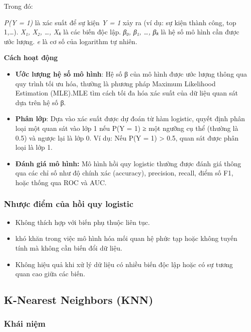 \documentclass[
]{article}
\providecommand{\tightlist}{%
  \setlength{\itemsep}{0pt}\setlength{\parskip}{0pt}}
\begin{document}
Trong đó:

\emph{P(Y = 1)} là xác suất để sự kiện \emph{Y = 1} xảy ra (ví dụ: sự
kiện thành công, top 1,\ldots). \emph{X₁, X₂, \ldots, Xₖ} là các biến
độc lập. \emph{β₀, β₁, \ldots, βₖ} là hệ số mô hình cần được ước lượng.
\emph{e} là cơ số của logarithm tự nhiên.

\textbf{Cách hoạt động}

\begin{itemize}
\item
  \textbf{Ước lượng hệ số mô hình}: Hệ số β của mô hình được ước lượng
  thông qua quy trình tối ưu hóa, thường là phương pháp Maximum
  Likelihood Estimation (MLE).MLE tìm cách tối đa hóa xác suất của dữ
  liệu quan sát dựa trên hệ số β.
\item
  \textbf{Phân lớp}: Dựa vào xác suất được dự đoán từ hàm logistic,
  quyết định phân loại một quan sát vào lớp 1 nếu P(Y = 1) ≥ một ngưỡng
  cụ thể (thường là 0.5) và ngược lại là lớp 0. Ví dụ: Nếu P(Y = 1)
  \textgreater{} 0.5, quan sát được phân loại là lớp 1.
\item
  \textbf{Đánh giá mô hình:} Mô hình hồi quy logistic thường được đánh
  giá thông qua các chỉ số như độ chính xác (accuracy), precision,
  recall, điểm số F1, hoặc thống qua ROC và AUC.
\end{itemize}

\subsubsection{Nhược điểm của hồi quy
logistic}\label{nhux1b0ux1ee3c-ux111iux1ec3m-cux1ee7a-hux1ed3i-quy-logistic}

\begin{itemize}
\tightlist
\item
  Không thích hợp với biến phụ thuộc liên tục.
\item
  khó khăn trong việc mô hình hóa mối quan hệ phức tạp hoặc không tuyến
  tính mà không cần biến đổi dữ liệu.
\item
  Không hiệu quả khi xử lý dữ liệu có nhiều biến độc lập hoặc có sự
  tương quan cao giữa các biến.
\end{itemize}

\subsection{K-Nearest Neighbors (KNN)}\label{k-nearest-neighbors-knn}

\subsubsection{Khái niệm}\label{khuxe1i-niux1ec7m-1}
\end{document}
